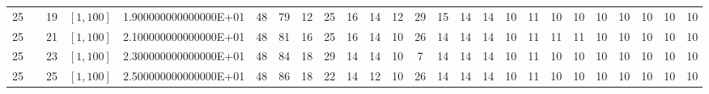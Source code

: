 \documentclass{article}
\begin{document}
\begin{landscape}
\begin{longtable}{ccccccccccccccccccccccccc}
  25 &  & 19         & $[1,100]$ & 1.900000000000000E+01 & \cellcolor{red!5} 48        &\cellcolor{red!75} 79        &\cellcolor{green!5} 12        &\cellcolor{red!5} 25        &16        &\cellcolor{green!5} 14        &\cellcolor{green!5} 12        &\cellcolor{red!5} 29        &\cellcolor{green!5} 15        &\cellcolor{green!5} 14        &\cellcolor{green!5} 14        &\cellcolor{green!25} 10        &\cellcolor{green!5} 11        &\cellcolor{green!25} 10        &\cellcolor{green!25} 10        &\cellcolor{green!25} 10        &\cellcolor{green!25} 10        &\cellcolor{green!25} 10        &\cellcolor{green!25} 10        &\cellcolor{green!25} 10\\
  25 &  & 21         & $[1,100]$ & 2.100000000000000E+01 & \cellcolor{red!5} 48        &\cellcolor{red!75} 81        &16        &\cellcolor{red!5} 25        &16        &\cellcolor{green!5} 14        &\cellcolor{green!25} 10        &\cellcolor{red!5} 26        &\cellcolor{green!5} 14        &\cellcolor{green!5} 14        &\cellcolor{green!5} 14        &\cellcolor{green!25} 10        &\cellcolor{green!5} 11        &\cellcolor{green!5} 11        &\cellcolor{green!5} 11        &\cellcolor{green!25} 10        &\cellcolor{green!25} 10        &\cellcolor{green!25} 10        &\cellcolor{green!25} 10        &\cellcolor{green!25} 10\\
  25 &  & 23         & $[1,100]$ & 2.300000000000000E+01 & \cellcolor{red!5} 48        &\cellcolor{red!75} 84        &\cellcolor{red!5} 18        &\cellcolor{red!5} 29        &\cellcolor{red!5} 14        &\cellcolor{red!5} 14        &\cellcolor{green!5} 10        &\cellcolor{green!75} 7         &\cellcolor{red!5} 14        &\cellcolor{red!5} 14        &\cellcolor{red!5} 14        &\cellcolor{green!5} 10        &\cellcolor{green!5} 11        &\cellcolor{green!5} 10        &\cellcolor{green!5} 10        &\cellcolor{green!5} 10        &\cellcolor{green!5} 10        &\cellcolor{green!5} 10        &\cellcolor{green!5} 10        &\cellcolor{green!5} 10\\
  25 &  & 25         & $[1,100]$ & 2.500000000000000E+01 & \cellcolor{red!5} 48        &\cellcolor{red!75} 86        &18        &\cellcolor{red!5} 22        &\cellcolor{green!5} 14        &\cellcolor{green!5} 12        &\cellcolor{green!25} 10        &\cellcolor{red!5} 26        &\cellcolor{green!5} 14        &\cellcolor{green!5} 14        &\cellcolor{green!5} 14        &\cellcolor{green!25} 10        &\cellcolor{green!5} 11        &\cellcolor{green!25} 10        &\cellcolor{green!25} 10        &\cellcolor{green!25} 10        &\cellcolor{green!25} 10        &\cellcolor{green!25} 10        &\cellcolor{green!25} 10        &\cellcolor{green!25} 10\\

\end{longtable}
\end{landscape}
\end{document}
